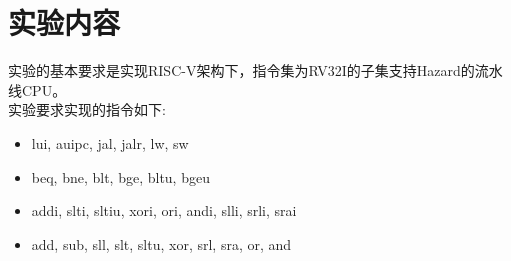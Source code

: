 
\section{实验内容}
实验的基本要求是实现RISC-V架构下，指令集为RV32I的子集支持Hazard的流水线CPU。 \\
实验要求实现的指令如下:
\begin{itemize}
    \item lui, auipc, jal, jalr, lw, sw
    \item beq, bne, blt, bge, bltu, bgeu
    \item addi, slti, sltiu, xori, ori, andi, slli, srli, srai
    \item add, sub, sll, slt, sltu, xor, srl, sra, or, and
\end{itemize}  